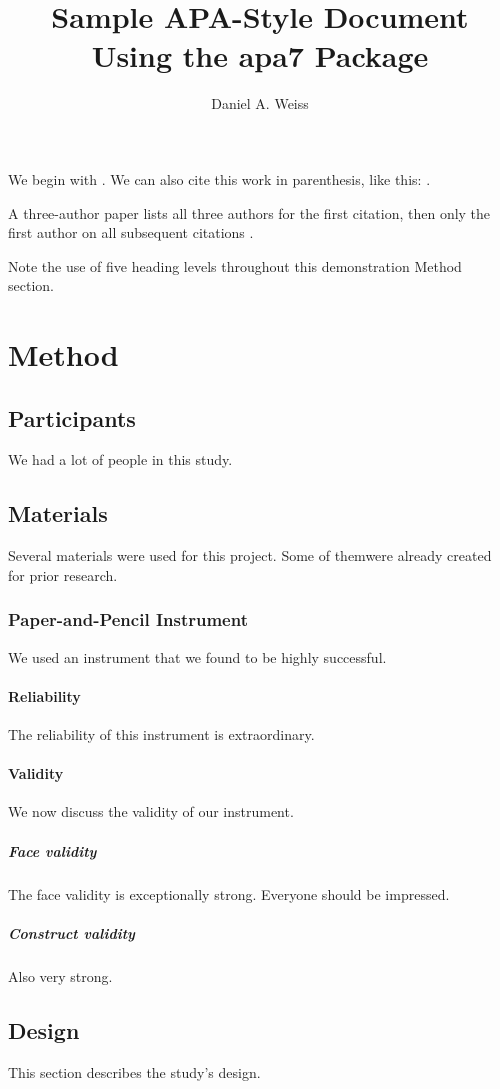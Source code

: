 \documentclass[jou]{apa7}
\title{Sample APA-Style Document Using the \textsf{apa7} Package}
\author{Daniel A. Weiss}
\affiliation{A University Somewhere}
\begin{document}
	\maketitle
	We begin with \textcite{Shotton1989}.  We can also cite this work in
	parenthesis, like this: \parencite{Shotton1989}.
	
	A three-author paper \parencite[e.g.,][]{Lassen2006} lists all
	three authors for the first citation, then only the first author
	on all subsequent citations \parencite{Lassen2006}.
	
	Note the use of five heading levels throughout this demonstration
	Method section.
	
	\section{Method}
	\subsection{Participants}
	We had a lot of people in this study.
	
	\subsection{Materials}
	Several materials were used for this project.  Some of themwere
	already created for prior research.
	
	\subsubsection{Paper-and-Pencil Instrument}
	We used an instrument that we found to be highly successful.
	
	\paragraph{Reliability}
	The reliability of this instrument is extraordinary.
	
	\paragraph{Validity}
	We now discuss the validity of our instrument.
	
	\subparagraph{Face validity} The face validity is exceptionally
	strong.  Everyone should be impressed.
	
	\subparagraph{Construct validity} Also very strong.
	
	\subsection{Design}
	This section describes the study's design.
	
\end{document}
